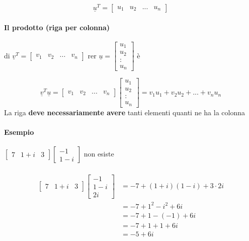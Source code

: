 $$
\underline{u}^T=
\begin{bmatrix}
    u_1 & u_2 & ... & u_n
\end{bmatrix}
$$

\paragraph{Il prodotto (riga per colonna)} di $\underline{v}^T=
\begin{bmatrix}
    v_1 & v_2& ... & v_n
\end{bmatrix}$
rer 
$
\underline{u}=
\begin{bmatrix}
    u_1\\u_2\\:\\u_n
\end{bmatrix}
$ è 

$$\underline{v}^T\underline{u}=
\begin{bmatrix}
    v_1 & v_2 & ... & v_n
\end{bmatrix}
\begin{bmatrix}
    u_1\\u_2\\:\\u_n
\end{bmatrix}
=v_1u_1+v_2u_2+...+v_nu_n
$$
{\color{red}
La riga \textbf{deve necessariamente avere} tanti elementi quanti ne ha la colonna
}

\paragraph{Esempio}
$
\begin{bmatrix}
    7 & 1+i & 3
\end{bmatrix}
\begin{bmatrix}
    -1 \\1-i
\end{bmatrix}
$ non esiste\\\\
\begin{align*}
    \begin{bmatrix}
        7 & 1+i & 3
    \end{bmatrix}
    \begin{bmatrix}
        -1 \\1-i \\ 2i
    \end{bmatrix}
& = -7+(1+i)(1-i)+3\cdot 2i\\
& = -7+1^2-i^2+6i\\
& = -7+1-(-1)+6i\\
& = -7+1+1+6i\\
& = -5+6i
\end{align*}
